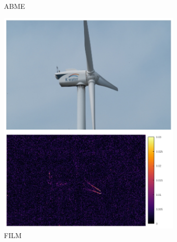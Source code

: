 \documentclass{article}
\begin{document}
\begin{figure}[h]
\begin{subfigure}{0.14\textwidth}
    \caption{ABME}
\end{subfigure}%
\begin{subfigure}{0.14\textwidth}
	\centering
    \includegraphics[width=1\linewidth]{qua_imgs/TEST02_045_f0465_film.jpg}
    \caption{FILM}
\end{subfigure}%
\begin{subfigure}{0.14\textwidth}
	\centering

\end{subfigure}
\end{figure}
\end{document}
